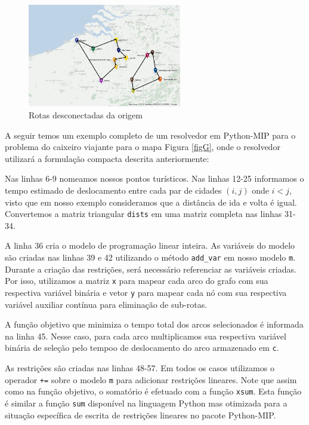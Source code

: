 \documentclass[a4paper,11pt,fleqn]{article}
\begin{document}
\begin{figure}
	\begin{centering}
		\includegraphics[width=0.6\textwidth]{belgium-tourism-14-subtour.png}
		\par\end{centering}
	\caption{Rotas desconectadas da origem}
	\label{figSub}
	
\end{figure}

A seguir temos um exemplo completo de um resolvedor em Python-MIP para o problema do caixeiro viajante para o mapa Figura \ref{figG}, onde o resolvedor utilizará a formulação compacta descrita anteriormente:

{\small

}

Nas linhas 6-9 nomeamos nossos pontos turísticos. Nas linhas 12-25 informamos o tempo estimado de deslocamento entre cada par de cidades $(i, j)$ onde $i<j$, visto que em nosso exemplo consideramos que a distância de ida e volta é igual. Convertemos a matriz triangular \texttt{dists} em uma matriz completa nas linhas 31-34.

A linha 36 cria o modelo de programação linear inteira. As variáveis do modelo são criadas nas linhas 39 e 42 utilizando o método \texttt{add\_var} em nosso modelo \texttt{m}. Durante a criação das restrições, será necessário referenciar as variáveis criadas. Por isso, utilizamos a matriz \texttt{x} para mapear cada arco do grafo com sua respectiva variável binária e  vetor \texttt{y} para mapear cada nó com sua respectiva variável auxiliar contínua para eliminação de sub-rotas.

A função objetivo que minimiza o tempo total dos arcos selecionados é informada na linha 45. Nesse caso, para cada arco multiplicamos sua respectiva variável binária de seleção pelo tempoo de deslocamento do arco armazenado em \texttt{c}.

As restrições são criadas nas linhas 48-57. Em todos os casos utilizamos o operador \texttt{+=} sobre o modelo \texttt{m} para adicionar restrições lineares. Note que assim como na função objetivo, o somatório é efetuado com a função \texttt{xsum}. Esta função é similar a função \texttt{sum} disponível na linguagem Python mas otimizada para a situação específica de escrita de restrições lineares no pacote Python-MIP\@. 
\end{document}
